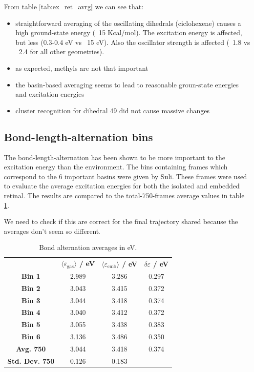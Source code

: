 \documentclass[twoside, 12pt]{article}
\begin{document}
From table \ref{tab:ex_ret_avrg} we can see that:
\begin{itemize}
 \item straightforward averaging of the oscillating dihedrals (ciclohexene) causes a high ground-state energy (~15 Kcal/mol). The excitation energy is affected, but less (0.3-0.4 eV vs ~15 eV).
 Also the oscillator strength is affected (~1.8 vs ~2.4 for all other geometries).
 \item as expected, methyls are not that important
 \item the basin-based averaging seems to lead to reasonable groun-state energies and excitation energies
 \item cluster recognition for dihedral 49 did not cause massive changes
\end{itemize}


\subsection{Bond-length-alternation bins}
The bond-length-alternation has been shown to be more important to the excitation energy than the environment. The bins containing frames which correspond to the 6 important basins were given by Suli. These frames were used to evaluate the average excitation energies for both the isolated and embedded retinal. The results are compared to the total-750-frames average values in table \ref{tab:ex_bins}.

We need to check if this are correct for the final trajectory shared because the averages don't seem so different.

\begin{table}[h]
\footnotesize
\centering
\caption{Bond alternation averages in eV.}
\label{tab:ex_bins}
\begin{tabular}{cccc}
& \textbf{$\langle \varepsilon_\mathrm{gas} \rangle$ / eV} & \textbf{$\langle \varepsilon_\mathrm{emb} \rangle$ / eV} & \textbf{$\delta \varepsilon$ / eV}  \\ 
\textbf{Bin 1} & 2.989 & 3.286 & 0.297\\ 
\textbf{Bin 2} & 3.043 & 3.415 & 0.372\\ 
\textbf{Bin 3} & 3.044 & 3.418 & 0.374\\ 
\textbf{Bin 4} & 3.040 & 3.412 & 0.372\\ 
\textbf{Bin 5} & 3.055 & 3.438 & 0.383\\ 
\textbf{Bin 6} & 3.136 & 3.486 & 0.350\\ 
\textbf{Avg. 750} &  3.044 & 3.418 & 0.374\\ 
\textbf{Std. Dev. 750} &  0.126 & 0.183 &\\ 
\end{tabular}
\end{table}


\clearpage
%

\end{document}
